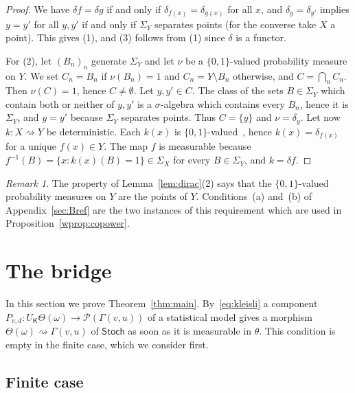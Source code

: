 \documentclass[11pt,a4paper]{article}
\theoremstyle{plain}
\theoremstyle{definition}
\theoremstyle{remark}
\newtheorem{remark}[theorem]{Remark}
\newcommand{\cat}[1]{\mathsf{#1}}
\newcommand{\catK}{\cat{K}}
\newcommand{\Stoch}{\cat{Stoch}}
\newcommand{\Prb}{\mathcal{P}}
\newcommand{\del}{\delta}
\begin{document}
\begin{proof}
We have $\del f = \del g$ if and only if $\delta_{f(x)} = \delta_{g(x)}$ for
all $x$, and $\delta_{y} = \delta_{y'}$ implies $y = y'$ for all $y, y'$ if and
only if $\Sigma_{Y}$ separates points (for the converse take $X$ a point).
This gives (1), and (3) follows from
(1) since $\del$ is a functor.

For (2), let $(B_n)_{n}$ generate $\Sigma_Y$ and let $\nu$ be a
$\{0,1\}$-valued probability measure on $Y$. We set $C_n = B_n$ if
$\nu(B_n) = 1$ and $C_n = Y \setminus B_n$ otherwise, and
$C = \bigcap_n C_n$. Then $\nu(C) = 1$, hence $C \neq \emptyset$. Let
$y, y' \in C$. The class of the sets $B \in \Sigma_Y$ which contain both or
neither of $y, y'$ is a $\sigma$-algebra which contains every $B_n$, hence it
is $\Sigma_Y$, and $y = y'$ because $\Sigma_Y$ separates points. Thus
$C = \{y\}$ and $\nu = \delta_y$. Let now $k \colon X \rightsquigarrow Y$ be
deterministic. Each $k(x)$ is
$\{0,1\}$-valued~\cite[Ex.~10.4]{fritz_synthetic_2020}, hence
$k(x) = \delta_{f(x)}$ for a unique $f(x) \in Y$. The map $f$ is measurable
because $f^{-1}(B) = \{x : k(x)(B) = 1\} \in \Sigma_X$ for every
$B \in \Sigma_Y$, and $k = \del f$.
\end{proof}

\begin{remark}\label{rem:dirac-hyp}
The property of Lemma~\ref{lem:dirac}(2) says that the $\{0,1\}$-valued
probability measures on $Y$ are the points of $Y$. Conditions~(a) and~(b) of
Appendix~\ref{sec:Bref} are the two instances of this requirement which are
used in Proposition~\ref{wprop:copower}.
\end{remark}
\section{The bridge}\label{sec:bridge}

In this section we prove Theorem~\ref{thm:main}. By~\eqref{eq:kleisli} a
component $P_{v,d} \colon U_\catK\Theta(\omega) \to \Prb(\Gamma(v,u))$ of a
statistical model gives a morphism
$\Theta(\omega) \rightsquigarrow \Gamma(v,u)$ of $\Stoch$ as soon as it is
measurable in $\theta$. This condition is empty in the finite case, which we
consider first.

\subsection{Finite case}\label{sec:finite}
\end{document}
